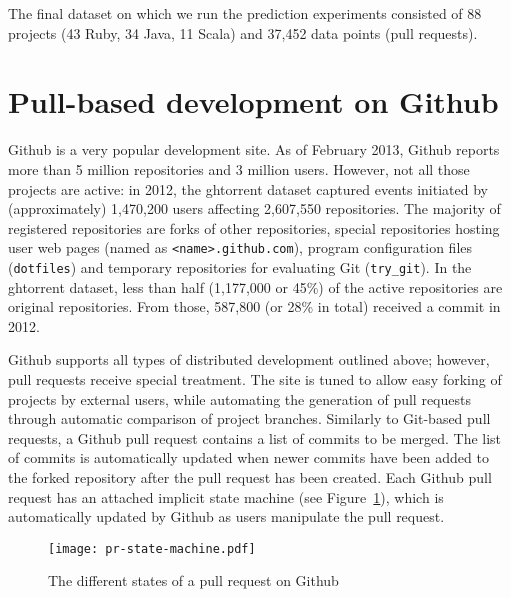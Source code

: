 \documentclass{acm_proc_article-sp}
\begin{document}
The final dataset on which we run the prediction experiments consisted of 88
projects (43 Ruby, 34 Java, 11 Scala) and 37,452 data points (pull requests).
%

\section{Pull-based development on Github}
\label{sec:github}

Github is a very popular development site. As of February 2013, Github reports
more than 5 million repositories and 3 million users. However, not all those
projects are active: in 2012, the {\sc ght}orrent dataset captured events initiated by
(approximately) 1,470,200 users affecting 2,607,550 repositories. The majority
of registered repositories are forks of other repositories, special repositories
hosting user web pages (named as \texttt{<name>.github.com}), program
configuration files (\texttt{dotfiles}) and temporary repositories for
evaluating Git (\texttt{try\_git}). In the {\sc ght}orrent dataset, less than half
(1,177,000 or 45\%) of the active repositories are original repositories. From
those, 587,800 (or 28\% in total) received a commit in 2012.

Github supports all types of distributed development outlined above; however,
pull requests receive special treatment. The site is tuned to allow easy forking
of projects by external users, while automating the generation of pull
requests through automatic comparison of project branches. Similarly to
Git-based pull requests, a Github pull request contains a list of commits
to be merged. The list of commits is automatically updated when newer commits have been added to the forked repository after the pull request
has been created. Each Github pull request has an attached implicit state
machine (see Figure~\ref{fig:state}), which is automatically updated by
Github as users manipulate the pull request.

\begin{figure}
  \begin{center}
    \texttt{[image: pr-state-machine.pdf]}
  \end{center}
  \caption{The different states of a pull request on Github}
  \label{fig:state}
\end{figure}
\end{document}

